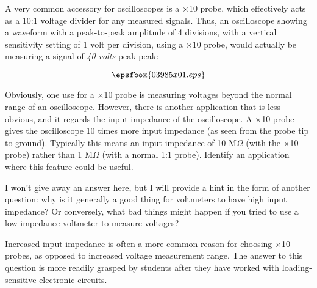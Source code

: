 

A very common accessory for oscilloscopes is a $\times$10 probe, which effectively acts as a 10:1 voltage divider for any measured signals.  Thus, an oscilloscope showing a waveform with a peak-to-peak amplitude of 4 divisions, with a vertical sensitivity setting of 1 volt per division, using a $\times$10 probe, would actually be measuring a signal of {\it 40 volts} peak-peak:

$$\epsfbox{03985x01.eps}$$

Obviously, one use for a $\times$10 probe is measuring voltages beyond the normal range of an oscilloscope.  However, there is another application that is less obvious, and it regards the input impedance of the oscilloscope.  A $\times$10 probe gives the oscilloscope 10 times more input impedance (as seen from the probe tip to ground).  Typically this means an input impedance of 10 M$\Omega$ (with the $\times$10 probe) rather than 1 M$\Omega$ (with a normal 1:1 probe).  Identify an application where this feature could be useful.







I won't give away an answer here, but I will provide a hint in the form of another question: why is it generally a good thing for voltmeters to have high input impedance?  Or conversely, what bad things might happen if you tried to use a low-impedance voltmeter to measure voltages?







Increased input impedance is often a more common reason for choosing $\times$10 probes, as opposed to increased voltage measurement range.  The answer to this question is more readily grasped by students after they have worked with loading-sensitive electronic circuits.




